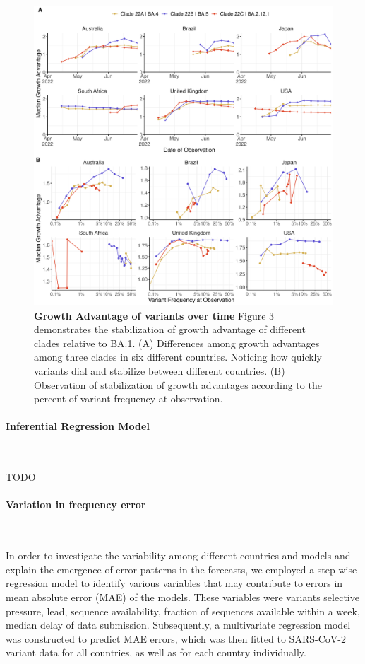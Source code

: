 \documentclass[11pt,oneside,letterpaper]{article}
\begin{document}
\begin{figure}[H]
	\centering
    \includegraphics[width=1.1\textwidth]{figures/ga_estimates.png}
	\caption{\textbf{Growth Advantage of variants over time}
	Figure 3 demonstrates the stabilization of growth advantage of different clades relative to BA.1.
	(A) Differences among growth advantages among three clades in six different countries. 
	Noticing how quickly variants dial and stabilize between different countries.
	(B) Observation of stabilization of growth advantages according to the percent of variant frequency at observation.
	}
	\label{Figure 3}
\end{figure}

\paragraph{Inferential Regression Model}\

TODO

\paragraph{Variation in frequency error}\

In order to investigate the variability among different countries and models and explain the emergence of error patterns in the forecasts, we employed a step-wise regression model to identify various variables that may contribute to errors in mean absolute error (MAE) of the models.
These variables were variants selective pressure, lead, sequence availability, fraction of sequences available within a week, median delay of data submission. 
Subsequently, a multivariate regression model was constructed to predict MAE errors, which was then fitted to SARS-CoV-2 variant data for all countries, as well as for each country individually.
\end{document}
